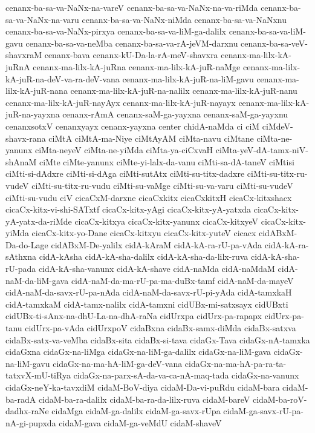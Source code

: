 {cenanx-ba-sa-va-NaNx-na-vareV
cenanx-ba-sa-va-NaNx-na-va-riMda
cenanx-ba-sa-va-NaNx-na-varu
cenanx-ba-sa-va-NaNx-niMda
cenanx-ba-sa-va-NaNxnu
cenanx-ba-sa-va-NaNx-pirxya
cenanx-ba-sa-va-liM-ga-dalilx
cenanx-ba-sa-va-liM-gavu
cenanx-ba-sa-va-neMba
cenanx-ba-sa-va-rA-jeVM-darxnu
cenanx-ba-sa-veV-shavxraM
cenanx-bava
cenanx-kU-Da-la-rA-meV-shavxra
cenanx-ma-lilx-kA-juRnA
cenanx-ma-lilx-kA-juRna
cenanx-ma-lilx-kA-juR-naMge
cenanx-ma-lilx-kA-juR-na-deV-va-ra-deV-vana
cenanx-ma-lilx-kA-juR-na-liM-gavu
cenanx-ma-lilx-kA-juR-nana
cenanx-ma-lilx-kA-juR-na-nalilx
cenanx-ma-lilx-kA-juR-nanu
cenanx-ma-lilx-kA-juR-nayAyx
cenanx-ma-lilx-kA-juR-nayayx
cenanx-ma-lilx-kA-juR-na-yayxna
cenanx-rAmA
cenanx-saM-ga-yayxna
cenanx-saM-ga-yayxnu
cenanxsotxV
cenanxyayx
cenanx-yayxna
center
chidA-naMda
ci
ciM
ciMdeV-shavx-rana
ciMtA
ciMtA-ma-Niye
ciMtAyAM
ciMta-navu
ciMtane
ciMta-ne-yanunx
ciMta-neyeV
ciMta-ne-yiMda
ciMta-ya-ciCxvaH
ciMta-yeV-dA-tamx-niV-shAnaM
ciMte
ciMte-yanunx
ciMte-yi-lalx-da-vanu
ciMti-sa-dA-taneV
ciMtisi
ciMti-si-dAdxre
ciMti-si-dAga
ciMti-sutAtx
ciMti-su-titx-dadxre
ciMti-su-titx-ru-vudeV
ciMti-su-titx-ru-vudu
ciMti-su-vaMge
ciMti-su-va-varu
ciMti-su-vudeV
ciMti-su-vudu
ciV
cicaCxM-darxne
cicaCxkitx
cicaCxkitxH
cicaCx-kitxshacx
cicaCx-kitx-vi-shi-SATxtf
cicaCx-kitx-yAgi
cicaCx-kitx-yA-yatxda
cicaCx-kitx-yA-yatx-da-riMde
cicaCx-kitxya
cicaCx-kitx-yanunx
cicaCx-kitxyeV
cicaCx-kitx-yiMda
cicaCx-kitx-yo-Dane
cicaCx-kitxyu
cicaCx-kitx-yuteV
cicacx
cidABxM-Da-do-Lage
cidABxM-De-yalilx
cidA-kAraM
cidA-kA-ra-rU-pa-vAda
cidA-kA-ra-sAthxna
cidA-kAsha
cidA-kA-sha-dalilx
cidA-kA-sha-da-lilx-ruva
cidA-kA-sha-rU-pada
cidA-kA-sha-vanunx
cidA-kA-shave
cidA-naMda
cidA-naMdaM
cidA-naM-da-liM-gava
cidA-naM-da-ma-rU-pa-ma-duBx-tamf
cidA-naM-da-mayeV
cidA-naM-da-savx-rU-pa-nAda
cidA-naM-da-savx-rU-pi-yAda
cidA-tamxkaH
cidA-tamxkaM
cidA-tamx-nalilx
cidA-tamxni
cidUBx-mi-satxsayx
cidUBxti
cidUBx-ti-sAnx-na-dhU-La-na-dhA-raNa
cidUrxpa
cidUrx-pa-rapapx
cidUrx-pa-tanu
cidUrx-pa-vAda
cidUrxpoV
cidaBxna
cidaBx-samx-diMda
cidaBx-satxva
cidaBx-satx-va-veMba
cidaBx-sita
cidaBx-si-tava
cidaGx-Tava
cidaGx-nA-tamxka
cidaGxna
cidaGx-na-liMga
cidaGx-na-liM-ga-dalilx
cidaGx-na-liM-gava
cidaGx-na-liM-gavu
cidaGx-na-ma-hA-liM-ga-deV-vana
cidaGx-na-ma-hA-pa-ra-ta-tatxvX-mU-tiRya
cidaGx-na-parx-sA-da-va-ca-nA-maq-tada
cidaGx-na-vanunx
cidaGx-neY-ka-tavxdiM
cidaM-BoV-diya
cidaM-Da-vi-puRdu
cidaM-bara
cidaM-ba-radA
cidaM-ba-ra-dalilx
cidaM-ba-ra-da-lilx-ruva
cidaM-bareV
cidaM-ba-roV-dadhx-raNe
cidaMga
cidaM-ga-dalilx
cidaM-ga-savx-rUpa
cidaM-ga-savx-rU-pa-nA-gi-pupxda
cidaM-gava
cidaM-ga-veMdU
cidaM-shaveV
}
